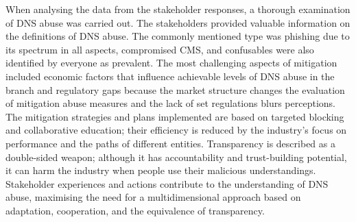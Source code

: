 When analysing the data from the stakeholder responses, a thorough examination of DNS abuse was carried out. The stakeholders provided valuable information on the definitions of DNS abuse. The commonly mentioned type was phishing due to its spectrum in all aspects, compromised CMS, and confusables were also identified by everyone as prevalent. The most challenging aspects of mitigation included economic factors that influence achievable levels of DNS abuse in the branch and regulatory gaps because the market structure changes the evaluation of mitigation abuse measures and the lack of set regulations blurs perceptions. The mitigation strategies and plans implemented are based on targeted blocking and collaborative education; their efficiency is reduced by the industry's focus on performance and the paths of different entities. Transparency is described as a double-sided weapon; although it has accountability and trust-building potential, it can harm the industry when people use their malicious understandings. Stakeholder experiences and actions contribute to the understanding of DNS abuse, maximising the need for a multidimensional approach based on adaptation, cooperation, and the equivalence of transparency.

